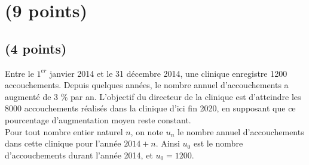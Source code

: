 \section{(9 points)}

\subsection{(4 points)}

Entre le $1^{er}$ janvier 2014 et le 31 décembre 2014, une clinique enregistre \num{1200} accouchements. Depuis quelques années, le nombre annuel d'accouchements a augmenté de 3 \% par an. L'objectif du directeur de la clinique est d'atteindre les \num{8000} accouchements réalisés dans la clinique d'ici fin 2020, en supposant que ce pourcentage d'augmentation moyen reste constant.\\

Pour tout nombre entier naturel $n$, on note $u_n$ le nombre annuel d'accouchements dans cette clinique pour l'année $2014+n$. Ainsi $u_0$ est le nombre d'accouchements durant l'année 2014, et $u_0=\num{1200}$.

